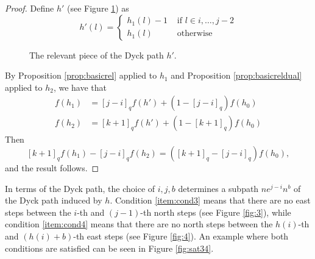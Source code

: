 \documentclass[10pt]{amsart}
\theoremstyle{definition}
\newcommand{\dyckpath}[2]{
\draw[line width=2pt] (#1) foreach \dir in {#2}{ -- ++(\dir*90:1)};
}
\begin{document}
\begin{proof}
Define $h'$ (see Figure \ref{fig:h'}) as
\[
h'(l)=\begin{cases}
h_1(l)-1& \text{ if } l \in {i,\ldots,j-2}\\
h_1(l)& \text{ otherwise}
\end{cases}
\]

\begin{figure}[htb]  \centering
{}
\caption{The relevant piece of the Dyck path $h'$.}
\label{fig:h'}
\end{figure}

By Proposition \ref{prop:basicrel} applied to $h_1$ and Proposition \ref{prop:basicreldual}  applied to $h_2$, we have that
\begin{align*}
f(h_1)&=[j-i]_qf(h')+(1-[j-i]_q)f(h_0)\\
f(h_2)&=[k+1]_qf(h')+(1-[k+1]_q)f(h_0)
\end{align*}
Then
\[
[k+1]_qf(h_1)-[j-i]_qf(h_2)=([k+1]_q-[j-i]_q)f(h_0),
\]
and the result follows.
\end{proof}

 In terms of the Dyck path, the choice of $i,j,b$ determines a subpath $ne^{j-i}n^b$ of the Dyck path induced by $h$.  Condition \eqref{item:cond3} means that there are no east steps between the $i$-th and $(j-1)$-th north steps (see Figure \ref{fig:3}), while condition \eqref{item:cond4} means that there are no north steps between the $h(i)$-th and $(h(i)+b)$-th east steps (see Figure \ref{fig:4}). An example where both conditions are satisfied can be seen in Figure \ref{fig:sat34}.\par
\end{document}
